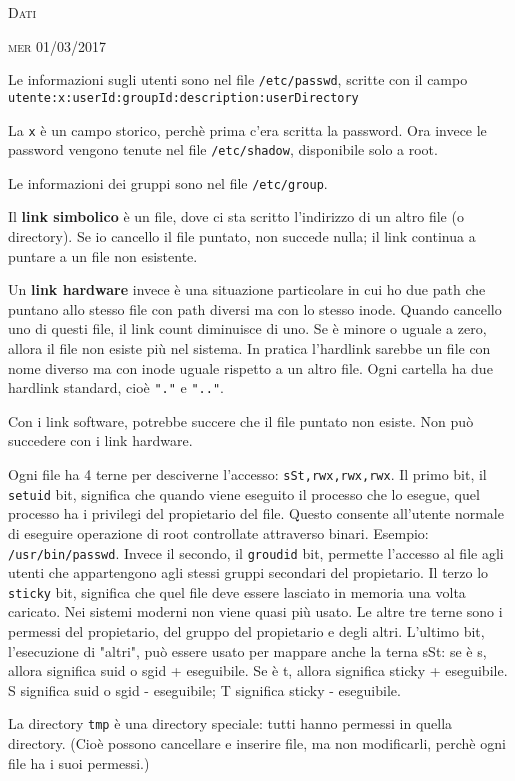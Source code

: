 \documentclass[a4paper,10pt]{article} %
\newcommand{\msection}[1]{%
    {\bigskip \par \normalsize \textsc {#1}}\par}
\renewcommand{\b}[1]{%
    {\textbf{#1}}}
\renewcommand{\t}[1]{%
    {\texttt{#1}}}
\begin{document}
\msection{Dati}

\msection{mer 01/03/2017}
Le informazioni sugli utenti sono nel file \texttt{/etc/passwd}, scritte con il campo \texttt{utente:x:userId:groupId:description:userDirectory}  

La \t{x} è un campo storico, perchè prima c'era scritta la password. Ora invece le password vengono tenute nel file \t{/etc/shadow}, disponibile solo a root.

Le informazioni dei gruppi sono nel file \t{/etc/group}.

Il \b{link simbolico} è un file, dove ci sta scritto l'indirizzo di un altro file (o directory). Se io cancello il file puntato, non succede nulla; il link continua a puntare a un file non esistente.

Un \b{link hardware} invece è una situazione particolare in cui ho due path che puntano allo stesso file con path diversi ma con lo stesso inode. Quando cancello uno di questi file, il link count diminuisce di uno. Se è minore o uguale a zero, allora il file non esiste più nel sistema. In pratica l'hardlink sarebbe un file con nome diverso ma con inode uguale rispetto a un altro file. Ogni cartella ha due hardlink standard, cioè \t{"."} e \t{".."}.

Con i link software, potrebbe succere che il file puntato non esiste. Non può succedere con i link hardware.

\par

Ogni file ha 4 terne per desciverne l'accesso: \t{sSt,rwx,rwx,rwx}. Il primo bit, il \t{setuid} bit, significa che quando viene eseguito il processo che lo esegue, quel processo ha i privilegi del propietario del file. Questo consente all'utente normale di eseguire operazione di root controllate attraverso binari. Esempio: \t{/usr/bin/passwd}. Invece il secondo, il \t{groudid} bit, permette l'accesso al file agli utenti che appartengono agli stessi gruppi secondari del propietario. Il terzo lo \t{sticky} bit, significa che quel file deve essere lasciato in memoria una volta caricato. Nei sistemi moderni non viene quasi più usato. Le altre tre terne sono i permessi del propietario, del gruppo del propietario e degli altri. L'ultimo bit, l'esecuzione di "altri", può essere usato per mappare anche la terna sSt: se è s, allora significa suid o sgid + eseguibile. Se è t, allora significa sticky + eseguibile. S significa suid o sgid - eseguibile; T significa sticky - eseguibile.

La directory \t{tmp} è una directory speciale: tutti hanno permessi in quella directory. (Cioè possono cancellare e inserire file, ma non modificarli, perchè ogni file ha i suoi permessi.)
\end{document}
